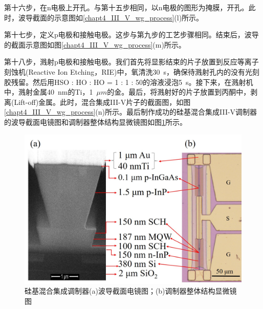 第十六步，在n电极上开孔。与第十五步相同，以n电极的图形为掩膜，开孔。此时，波导截面的示意图如\ref{chapt4_III_V_wg_process}(l)所示。

第十七步，定义p电极和接触电极。这步与第九步的工艺步骤相同。结束后，波导的截面示意图如图\ref{chapt4_III_V_wg_process}(m)所示。

第十八步，溅射p电极和接触电极。我们首先将显影结束的片子放置到反应等离子刻蚀机(Reactive Ion Etching，RIE)中，氧清洗30~s，确保待溅射孔内的没有光刻胶残留。然后用HSO : HO : HO = 1 : 1 : 50的溶液浸泡5~s。接下来，在溅射机中，溅射金属40~nm的Ti，1~$\mu m$的金。最后，将溅射好的片子放置到丙酮中，剥离(Lift-off)金属。此时，混合集成III-V片子的截面图，如图\ref{chapt4_III_V_wg_process}(n)所示。最后制作成功的硅基混合集成III-V调制器的波导截面电镜图和调制器整体结构显微镜图如图\ref{chapt4_III_V_results}所示。
\begin{figure}[htb]
	\centering
	\includegraphics[width=12cm]{./Pictures/chapt4_III_V_results.jpg}
	\caption{硅基混合集成调制器(a)波导截面电镜图；(b)调制器整体结构显微镜图}
	\label{chapt4_III_V_results}
\end{figure}

